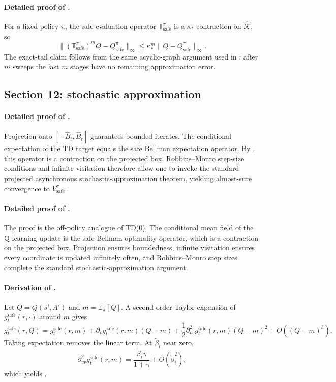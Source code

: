 \documentclass{article}
\theoremstyle{remark}
\newcommand{\E}{\mathbb{E}}
\newcommand{\safe}{\mathrm{safe}}
\newcommand{\Ksafe}{\widehat{\mathcal K}}
\newcommand{\Bhat}{\widehat B}
\begin{document}
\paragraph{Detailed proof of .}
For a fixed policy $\pi$, the safe evaluation operator $\mathbb T_\safe^{\pi}$ is a $\kappa_*$-contraction on $\Ksafe$, so
\[
\|(\mathbb T_\safe^{\pi})^mQ-Q_\safe^{\pi}\|_\infty\le \kappa_*^m\|Q-Q_\safe^{\pi}\|_\infty.
\]
The exact-tail claim follows from the same acyclic-graph argument used in : after $m$ sweeps the last $m$ stages have no remaining approximation error.

\subsection{Section 12: stochastic approximation}
\label{app:stochastic}

\paragraph{Detailed proof of .}
Projection onto $[-\Bhat_t,\Bhat_t]$ guarantees bounded iterates.
The conditional expectation of the TD target equals the safe Bellman expectation operator.
By , this operator is a contraction on the projected box.
Robbins--Monro step-size conditions and infinite visitation therefore allow one to invoke the standard projected asynchronous stochastic-approximation theorem, yielding almost-sure convergence to $V_\safe^\pi$.

\paragraph{Detailed proof of .}
The proof is the off-policy analogue of TD(0).
The conditional mean field of the Q-learning update is the safe Bellman optimality operator, which is a contraction on the projected box.
Projection ensures boundedness, infinite visitation ensures every coordinate is updated infinitely often, and Robbins--Monro step sizes complete the standard stochastic-approximation argument.

\paragraph{Derivation of .}
Let $Q=Q(s',A')$ and $m=\E_\pi[Q]$.
A second-order Taylor expansion of $g_t^{\safe}(r,\cdot)$ around $m$ gives
\[
g_t^{\safe}(r,Q)=g_t^{\safe}(r,m)+\partial_v g_t^{\safe}(r,m)(Q-m)+\frac{1}{2}\partial_{vv}^2 g_t^{\safe}(r,m)(Q-m)^2+O((Q-m)^3).
\]
Taking expectation removes the linear term.
At $\widetilde\beta_t$ near zero,
\[
\partial_{vv}^2 g_t^{\safe}(r,m)=\frac{\widetilde\beta_t\gamma}{1+\gamma}+O(\widetilde\beta_t^2),
\]
which yields .
\end{document}
